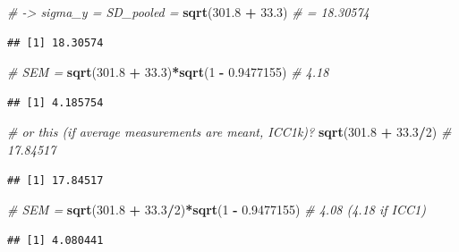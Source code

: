 \documentclass[
]{book}
\newenvironment{Shaded}{\begin{snugshade}}{\end{snugshade}}
\newcommand{\CommentTok}[1]{\textcolor[rgb]{0.56,0.35,0.01}{\textit{#1}}}
\newcommand{\DecValTok}[1]{\textcolor[rgb]{0.00,0.00,0.81}{#1}}
\newcommand{\FloatTok}[1]{\textcolor[rgb]{0.00,0.00,0.81}{#1}}
\newcommand{\FunctionTok}[1]{\textcolor[rgb]{0.13,0.29,0.53}{\textbf{#1}}}
\newcommand{\NormalTok}[1]{#1}
\newcommand{\SpecialCharTok}[1]{\textcolor[rgb]{0.81,0.36,0.00}{\textbf{#1}}}
\begin{document}
\begin{Shaded}
\begin{Highlighting}[]
\CommentTok{\# {-}\textgreater{} sigma\_y = SD\_pooled = }
\FunctionTok{sqrt}\NormalTok{(}\FloatTok{301.8} \SpecialCharTok{+} \FloatTok{33.3}\NormalTok{) }\CommentTok{\# = 18.30574}
\end{Highlighting}
\end{Shaded}

\begin{verbatim}
## [1] 18.30574
\end{verbatim}

\begin{Shaded}
\begin{Highlighting}[]
\CommentTok{\# SEM = }
\FunctionTok{sqrt}\NormalTok{(}\FloatTok{301.8} \SpecialCharTok{+} \FloatTok{33.3}\NormalTok{)}\SpecialCharTok{*}\FunctionTok{sqrt}\NormalTok{(}\DecValTok{1} \SpecialCharTok{{-}} \FloatTok{0.9477155}\NormalTok{) }\CommentTok{\# 4.18}
\end{Highlighting}
\end{Shaded}

\begin{verbatim}
## [1] 4.185754
\end{verbatim}

\begin{Shaded}
\begin{Highlighting}[]
\CommentTok{\# or this (if average measurements are meant, ICC1k)?}
\FunctionTok{sqrt}\NormalTok{(}\FloatTok{301.8} \SpecialCharTok{+} \FloatTok{33.3}\SpecialCharTok{/}\DecValTok{2}\NormalTok{) }\CommentTok{\# 17.84517}
\end{Highlighting}
\end{Shaded}

\begin{verbatim}
## [1] 17.84517
\end{verbatim}

\begin{Shaded}
\begin{Highlighting}[]
\CommentTok{\# SEM = }
\FunctionTok{sqrt}\NormalTok{(}\FloatTok{301.8} \SpecialCharTok{+} \FloatTok{33.3}\SpecialCharTok{/}\DecValTok{2}\NormalTok{)}\SpecialCharTok{*}\FunctionTok{sqrt}\NormalTok{(}\DecValTok{1} \SpecialCharTok{{-}} \FloatTok{0.9477155}\NormalTok{) }\CommentTok{\# 4.08 (4.18 if ICC1)}
\end{Highlighting}
\end{Shaded}

\begin{verbatim}
## [1] 4.080441
\end{verbatim}
\end{document}
